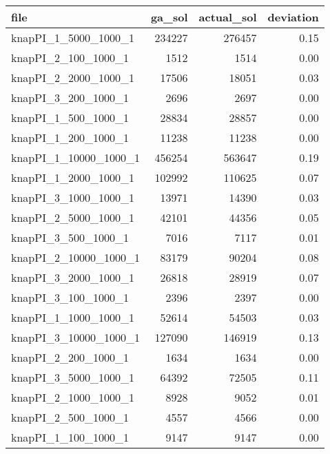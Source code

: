 \begin{tabular}{lrrr}
  \toprule
                    file &  ga\_sol &  actual\_sol &  deviation \\
  \midrule
    knapPI\_1\_5000\_1000\_1 &  234227 &      276457 &                  0.15 \\
     knapPI\_2\_100\_1000\_1 &    1512 &        1514 &                  0.00 \\
    knapPI\_2\_2000\_1000\_1 &   17506 &       18051 &                  0.03 \\
     knapPI\_3\_200\_1000\_1 &    2696 &        2697 &                  0.00 \\
     knapPI\_1\_500\_1000\_1 &   28834 &       28857 &                  0.00 \\
     knapPI\_1\_200\_1000\_1 &   11238 &       11238 &                  0.00 \\
   knapPI\_1\_10000\_1000\_1 &  456254 &      563647 &                  0.19 \\
    knapPI\_1\_2000\_1000\_1 &  102992 &      110625 &                  0.07 \\
    knapPI\_3\_1000\_1000\_1 &   13971 &       14390 &                  0.03 \\
    knapPI\_2\_5000\_1000\_1 &   42101 &       44356 &                  0.05 \\
     knapPI\_3\_500\_1000\_1 &    7016 &        7117 &                  0.01 \\
   knapPI\_2\_10000\_1000\_1 &   83179 &       90204 &                  0.08 \\
    knapPI\_3\_2000\_1000\_1 &   26818 &       28919 &                  0.07 \\
     knapPI\_3\_100\_1000\_1 &    2396 &        2397 &                  0.00 \\
    knapPI\_1\_1000\_1000\_1 &   52614 &       54503 &                  0.03 \\
   knapPI\_3\_10000\_1000\_1 &  127090 &      146919 &                  0.13 \\
     knapPI\_2\_200\_1000\_1 &    1634 &        1634 &                  0.00 \\
    knapPI\_3\_5000\_1000\_1 &   64392 &       72505 &                  0.11 \\
    knapPI\_2\_1000\_1000\_1 &    8928 &        9052 &                  0.01 \\
     knapPI\_2\_500\_1000\_1 &    4557 &        4566 &                  0.00 \\
     knapPI\_1\_100\_1000\_1 &    9147 &        9147 &                  0.00 \\
  \bottomrule
  \end{tabular}
  